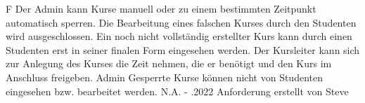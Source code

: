 \begin{myreq}
    \threeinline
    {\reqno }
    {\reqtype F}
    {}
    \reqdesc Der Admin kann Kurse manuell oder zu einem bestimmten Zeitpunkt automatisch sperren.
    \reqrat Die Bearbeitung eines falschen Kurses durch den Studenten wird ausgeschlossen. Ein noch nicht vollständig erstellter Kurs kann durch einen Studenten erst in seiner finalen Form eingesehen werden.
    Der Kursleiter kann sich zur Anlegung des Kurses die Zeit nehmen, die er benötigt und den Kurs im Anschluss freigeben.
    \reqorig Admin
    \reqfit Gesperrte Kurse können nicht von Studenten eingesehen bzw. bearbeitet werden.
    \twoinline
    {}
    {}
    \twoinline
    {}
    {\reqconf N.A.}
    \reqmater -
    .2022 Anforderung erstellt von Steve
\end{myreq}